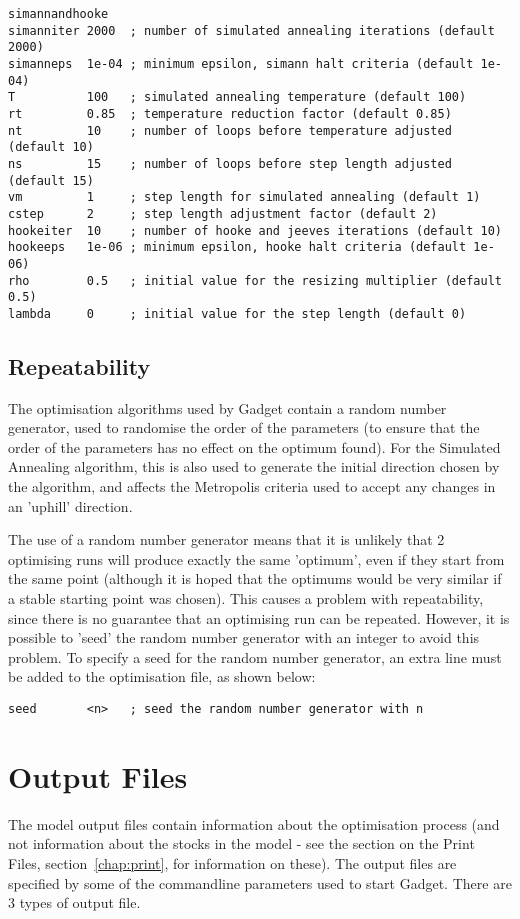 \documentclass [a4paper, 10pt]{book}
\begin{document}
{\small\begin{verbatim}
simannandhooke
simanniter 2000  ; number of simulated annealing iterations (default 2000)
simanneps  1e-04 ; minimum epsilon, simann halt criteria (default 1e-04)
T          100   ; simulated annealing temperature (default 100)
rt         0.85  ; temperature reduction factor (default 0.85)
nt         10    ; number of loops before temperature adjusted (default 10)
ns         15    ; number of loops before step length adjusted (default 15)
vm         1     ; step length for simulated annealing (default 1)
cstep      2     ; step length adjustment factor (default 2)
hookeiter  10    ; number of hooke and jeeves iterations (default 10)
hookeeps   1e-06 ; minimum epsilon, hooke halt criteria (default 1e-06)
rho        0.5   ; initial value for the resizing multiplier (default 0.5)
lambda     0     ; initial value for the step length (default 0)
\end{verbatim}}

\section{Repeatability}\label{sec:repeat}
The optimisation algorithms used by Gadget contain a random number generator, used to randomise the order of the parameters (to ensure that the order of the parameters has no effect on the optimum found).  For the Simulated Annealing algorithm, this is also used to generate the initial direction chosen by the algorithm, and affects the Metropolis criteria used to accept any changes in an 'uphill' direction.

\bigskip
The use of a random number generator means that it is unlikely that 2 optimising runs will produce exactly the same 'optimum', even if they start from the same point (although it is hoped that the optimums would be very similar if a stable starting point was chosen).  This causes a problem with repeatability, since there is no guarantee that an optimising run can be repeated.  However, it is possible to 'seed' the random number generator with an integer to avoid this problem.  To specify a seed for the random number generator, an extra line must be added to the optimisation file, as shown below:

{\small\begin{verbatim}
seed       <n>   ; seed the random number generator with n
\end{verbatim}}

\chapter{Output Files}\label{chap:output}
The model output files contain information about the optimisation process (and not information about the stocks in the model - see the section on the Print Files, section~\ref{chap:print}, for information on these).  The output files are specified by some of the commandline parameters used to start Gadget.  There are 3 types of output file.
\end{document}
